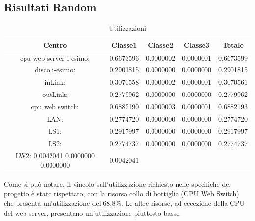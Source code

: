 \subsection{Risultati Random}
\begin{table}[H]
\begin{center}
\begin{tabular}{||c|c|c|c|c||}
\hline
Centro &Classe1 &Classe2 &Classe3 &Totale\\
\hline
\hline
 cpu web server i-esimo: 	&0.6673596	&0.0000002	&0.0000001	&0.6673599\\
\hline
 disco i-esimo: 	&0.2901815	&0.0000000	&0.0000000	&0.2901815\\
\hline
 inLink: 	&0.3070558	&0.0000002	&0.0000001	&0.3070561\\
\hline
 outLink: 	&0.2779962	&0.0000000	&0.0000000	&0.2779962\\
\hline
 cpu web switch: 	&0.6882190	&0.0000003	&0.0000001	&0.6882193\\
\hline
 LAN: 	&0.2774720	&0.0000000	&0.0000000	&0.2774720\\
\hline
 LS1: 	&0.2917997	&0.0000000	&0.0000000	&0.2917997\\
\hline
 LS2:	&0.2774737	&0.0000000	&0.0000000	&0.2774737\\
\hline
 LW2: 	0.0042041	0.0000000	0.0000000	&0.0042041\\
\hline
\end{tabular}
\end{center}
\caption{Utilizzazioni}
\label{risrandom}
\end{table}
Come si può notare, il vincolo sull'utilizzazione richiesto nelle specifiche del progetto è stato rispettato, con la risorsa collo di bottiglia (CPU Web Switch) che presenta un'utilizzazione del 68,8\%. Le altre risorse, ad eccezione della CPU del web server, presentano un'utilizzazione piuttosto basse.

